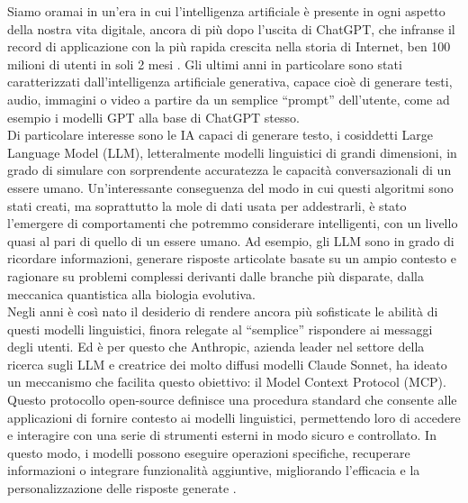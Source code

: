 ﻿Siamo oramai in un'era in cui l'intelligenza artificiale è presente in ogni aspetto della nostra vita digitale, ancora di più dopo l'uscita di ChatGPT, che infranse il record di applicazione con la più rapida crescita nella storia di Internet, ben 100 milioni di utenti in soli 2 mesi \cite{ubs2023latest}. Gli ultimi anni in particolare sono stati caratterizzati dall’intelligenza artificiale generativa, capace cioè di generare testi, audio, immagini o video a partire da un semplice “prompt” dell’utente, come ad esempio i modelli GPT alla base di ChatGPT stesso. \\
Di particolare interesse sono le IA capaci di generare testo, i cosiddetti Large Language Model (LLM), letteralmente modelli linguistici di grandi dimensioni, in grado di simulare con sorprendente accuratezza le capacità conversazionali di un essere umano. Un'interessante conseguenza del modo in cui questi algoritmi sono stati creati, ma soprattutto la mole di dati usata per addestrarli, è stato l’emergere di comportamenti che potremmo considerare intelligenti, con un livello quasi al pari di quello di un essere umano. Ad esempio, gli LLM sono in grado di ricordare informazioni, generare risposte articolate basate su un ampio contesto e ragionare su problemi complessi derivanti dalle branche più disparate, dalla meccanica quantistica alla biologia evolutiva. \\
Negli anni è così nato il desiderio di rendere ancora più sofisticate le abilità di questi modelli linguistici, finora relegate al “semplice” rispondere ai messaggi degli utenti. Ed è per questo che Anthropic, azienda leader nel settore della ricerca sugli LLM e creatrice dei molto diffusi modelli Claude Sonnet, ha ideato un meccanismo che facilita questo obiettivo: il Model Context Protocol (MCP). Questo protocollo open-source definisce una procedura standard che consente alle applicazioni di fornire contesto ai modelli linguistici, permettendo loro di accedere e interagire con una serie di strumenti esterni in modo sicuro e controllato. In questo modo, i modelli possono eseguire operazioni specifiche, recuperare informazioni o integrare funzionalità aggiuntive, migliorando l’efficacia e la personalizzazione delle risposte generate \cite{modelcontextprotocol2023}. \\
